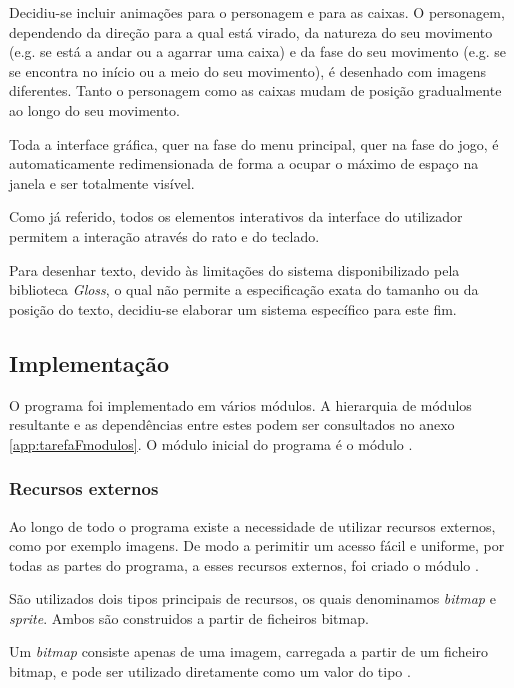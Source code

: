 \documentclass[a4paper]{article}
\begin{document}
Decidiu-se incluir animações para o personagem e para as caixas. O personagem, dependendo da direção para a qual está virado, da natureza do seu movimento (e.g. se está a andar ou a agarrar uma caixa) e da fase do seu movimento (e.g. se se encontra no início ou a meio do seu movimento), é desenhado com imagens diferentes. Tanto o personagem como as caixas mudam de posição gradualmente ao longo do seu movimento.

\bigskip

Toda a interface gráfica, quer na fase do menu principal, quer na fase do jogo, é automaticamente redimensionada de forma a ocupar o máximo de espaço na janela e ser totalmente visível.

Como já referido, todos os elementos interativos da interface do utilizador permitem a interação através do rato e do teclado.

Para desenhar texto, devido às limitações do sistema disponibilizado pela biblioteca \textit{Gloss}, o qual não permite a especificação exata do tamanho ou da posição do texto, decidiu-se elaborar um sistema específico para este fim.

\subsection{Implementação}
\label{sec:tarefaFimpl}

O programa foi implementado em vários módulos. A hierarquia de módulos resultante e as dependências entre estes podem ser consultados no anexo \ref{app:tarefaFmodulos}. O módulo inicial do programa é o módulo .

\subsubsection{Recursos externos}

Ao longo de todo o programa existe a necessidade de utilizar recursos externos, como por exemplo imagens. De modo a perimitir um acesso fácil e uniforme, por todas as partes do programa, a esses recursos externos, foi criado o módulo . 

\bigskip

São utilizados dois tipos principais de recursos, os quais denominamos \emph{bitmap} e \emph{sprite}. Ambos são construidos a partir de ficheiros bitmap.

Um \emph{bitmap} consiste apenas de uma imagem, carregada a partir de um ficheiro bitmap, e pode ser utilizado diretamente como um valor do tipo .
\end{document}

